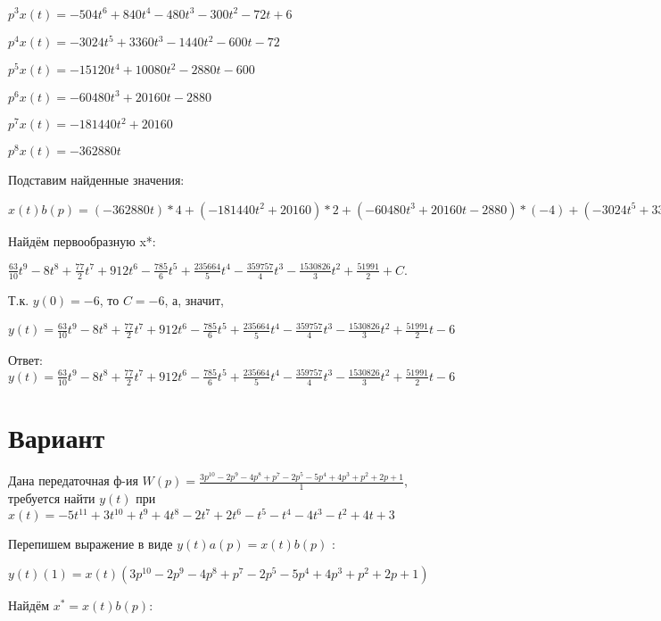 \documentclass{article}
\begin{document}
{{{$p^3x(t)=-504t^{6}+840t^{4}-480t^{3}-300t^{2}-72t+6$

$p^4x(t)=-3024t^{5}+3360t^{3}-1440t^{2}-600t-72$

$p^5x(t)=-15120t^{4}+10080t^{2}-2880t-600$

$p^6x(t)=-60480t^{3}+20160t-2880$

$p^7x(t)=-181440t^{2}+20160$

$p^8x(t)=-362880t$

Подставим найденные значения:

$x(t)b(p) = (-362880t)*4+(-181440t^{2}+20160)*2+(-60480t^{3}+20160t-2880)*(-4)+(-3024t^{5}+3360t^{3}-1440t^{2}-600t-72)*(-2)+(-504t^{6}+840t^{4}-480t^{3}-300t^{2}-72t+6)*(-1)+(-72t^{7}+168t^{5}-120t^{4}-100t^{3}-36t^{2}+6t-8)*1+(-9t^{8}+28t^{6}-24t^{5}-25t^{4}-12t^{3}+3t^{2}-8t-3)*(-5)+(-9t^{8}+28t^{6}-24t^{5}-25t^{4}-12t^{3}+3t^{2}-8t-3)*(-2)=63t^{8}-72t^{7}+308t^{6}+6384t^{5}-785t^{4}+235664t^{3}-359757t^{2}-1530826t$





Найдём первообразную x*:

$\frac{63}{10}t^{9}-8t^{8}+\frac{77}{2}t^{7}+912t^{6}-\frac{785}{6}t^{5}+\frac{235664}{5}t^{4}-\frac{359757}{4}t^{3}-\frac{1530826}{3}t^{2}+\frac{51991}{2}+C.$

Т.к. $y(0)=-6$, то $C=-6$, а, значит, 

$y(t)=\frac{63}{10}t^{9}-8t^{8}+\frac{77}{2}t^{7}+912t^{6}-\frac{785}{6}t^{5}+\frac{235664}{5}t^{4}-\frac{359757}{4}t^{3}-\frac{1530826}{3}t^{2}+\frac{51991}{2}t-6$

Ответ: $y(t) = \frac{63}{10}t^{9}-8t^{8}+\frac{77}{2}t^{7}+912t^{6}-\frac{785}{6}t^{5}+\frac{235664}{5}t^{4}-\frac{359757}{4}t^{3}-\frac{1530826}{3}t^{2}+\frac{51991}{2}t-6$

\section{Вариант}

Дана передаточная ф-ия $W(p)=\frac{3p^{10}-2p^{9}-4p^{8}+p^{7}-2p^{5}-5p^{4}+4p^{3}+p^{2}+2p+1}{1}$, требуется найти $y(t)$ при $x(t)=-5t^{11}+3t^{10}+t^{9}+4t^{8}-2t^{7}+2t^{6}-t^{5}-t^{4}-4t^{3}-t^{2}+4t+3$

Перепишем выражение в виде $y(t)a(p)=x(t)b(p)$ :

$y(t)(1)=x(t)(3p^{10}-2p^{9}-4p^{8}+p^{7}-2p^{5}-5p^{4}+4p^{3}+p^{2}+2p+1)$

Найдём $x^*=x(t)b(p)$:

}}}
\end{document}
